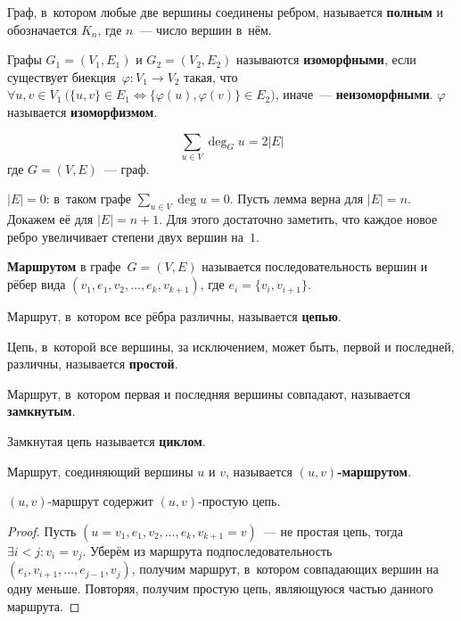 Граф, в~котором любые две вершины соединены ребром, называется \textbf{полным} и обозначается $K_n$, где $n$~--- число вершин в~нём.

Графы $G_1 = (V_1, E_1)$ и $G_2 = (V_2, E_2)$ называются \textbf{изоморфными}, если существует биекция~$\varphi \colon V_1 \to V_2$ такая, что
$\forall u, v \in V_1 \ \bigl( \{ u, v \} \in E_1 \Leftrightarrow \{ \varphi(u), \varphi(v) \} \in E_2 \bigr)$, иначе~--- \textbf{неизоморфными}.
$\varphi$ называется \textbf{изоморфизмом}.

\begin{lemma}[о~рукопожатиях]
\begin{equation*}
\sum_{u \in V} \deg_G u = 2|E|
\end{equation*}
где $G = (V, E)$~--- граф.
\end{lemma}
\begin{proofmathind}
	\indbase $|E| = 0$: в~таком графе $\displaystyle \sum_{u \in V} \deg u = 0$.
	\indstep Пусть лемма верна для $|E| = n$.
	Докажем её для $|E| = n + 1$.
	Для этого достаточно заметить, что каждое новое ребро увеличивает степени двух вершин на~$1$. \indend
\end{proofmathind}

 \textbf{Маршрутом} в графе~$G = (V, E)$ называется последовательность вершин и рёбер вида
$(v_1, e_1, v_2, \ldots, e_k, v_{k+1})$, где $e_i = \{ v_i, v_{i+1} \}$.

 Маршрут, в~котором все рёбра различны, называется \textbf{цепью}.

Цепь, в~которой все вершины, за исключением, может быть, первой и последней, различны, называется \textbf{простой}.

Маршрут, в~котором первая и последняя вершины совпадают, называется \textbf{замкнутым}.

 Замкнутая цепь называется \textbf{циклом}.

Маршрут, соединяющий вершины $u$ и $v$, называется \textbf{$(u, v)$-маршрутом}.

\begin{lemma}
$(u, v)$-маршрут содержит $(u, v)$-простую цепь.
\end{lemma}
\begin{proof}
Пусть $(u = v_1, e_1, v_2, \ldots, e_k, v_{k+1} = v)$~--- не простая цепь, тогда $\exists i < j \colon v_i = v_j$.
Уберём из маршрута подпоследовательность $(e_i, v_{i+1}, \ldots, e_{j-1}, v_j)$, получим маршрут, в~котором совпадающих вершин на одну меньше.
Повторяя, получим простую цепь, являющуюся частью данного маршрута.
\end{proof}

